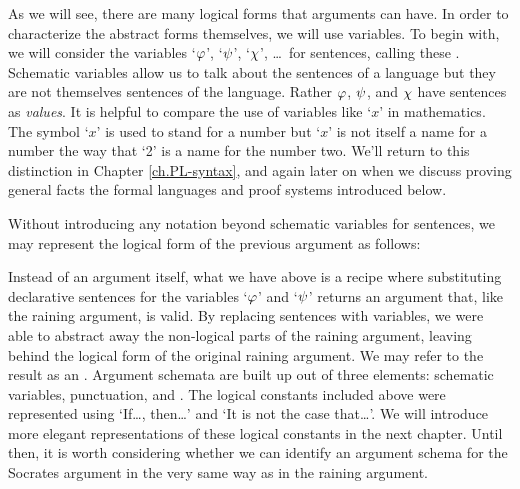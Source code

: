 \begin{earg}
\end{earg}

As we will see, there are many logical forms that arguments can have.
In order to characterize the abstract forms themselves, we will use variables.
To begin with, we will consider the variables `$\varphi$', `$\psi$', `$\chi$', \ldots\ for sentences, calling these .
Schematic variables allow us to talk about the sentences of a language but they are not themselves sentences of the language.
Rather $\varphi$, $\psi$, and $\chi$ have sentences as \textit{values}.
It is helpful to compare the use of variables like `$x$' in mathematics.
The symbol `$x$' is used to stand for a number but `$x$' is not itself a name for a number the way that `2' is a name for the number two.
We'll return to this distinction in Chapter \ref{ch.PL-syntax}, and again later on when we discuss proving general facts the formal languages and proof systems introduced below.

Without introducing any notation beyond schematic variables for sentences, we may represent the logical form of the previous argument as follows:

\begin{earg}
\end{earg}

Instead of an argument itself, what we have above is a recipe where substituting declarative sentences for the variables `$\varphi$' and `$\psi$' returns an argument that, like the raining argument, is valid.
By replacing sentences with variables, we were able to abstract away the non-logical parts of the raining argument, leaving behind the logical form of the original raining argument.
We may refer to the result as an .
Argument schemata are built up out of three elements: schematic variables, punctuation, and .
The logical constants included above were represented using `If\ldots, then\ldots' and `It is not the case that\ldots'.
We will introduce more elegant representations of these logical constants in the next chapter.
Until then, it is worth considering whether we can identify an argument schema for the Socrates argument in the very same way as in the raining argument.

